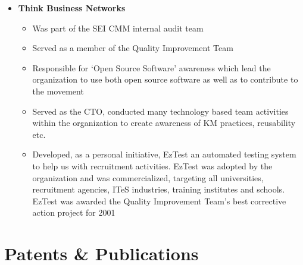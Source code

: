 \documentclass[a4paper,12pt]{article}
\begin{document}
\begin{itemize}
\begin{itemize}
\begin{itemize}
      \end{itemize}
      
    \end{itemize}

  \item{\textbf{Think Business Networks}}

    \begin{itemize}
      
      \setlength\itemsep{-0.5em}
      
      \item Was part of the SEI CMM internal audit team 

      \item Served as a member of the Quality Improvement Team 

      \item Responsible for `Open Source Software' awareness which 
        lead the organization to use both open source software as well
        as to contribute to the movement

      \item Served as the CTO, conducted many technology based team
        activities within the organization to create awareness of KM
        practices, reusability etc.

      \item Developed, as a personal initiative, EzTest an automated
        testing system to help us with recruitment activities. EzTest
        was adopted by the organization and was commercialized,
        targeting all universities, recruitment agencies, ITeS
        industries, training institutes and schools. EzTest was
        awarded the Quality Improvement Team's best corrective action
        project for 2001
        
    \end{itemize}
\end{itemize}

\section*{Patents \& Publications}
\end{document}
